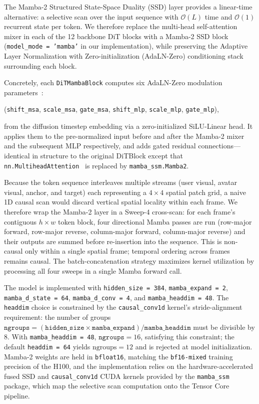 \documentclass[12pt,letterpaper]{report}
\begin{document}
The Mamba-2 Structured State-Space Duality (SSD) layer \cite{dao2024transformers} provides a linear-time alternative: a selective scan over the input sequence with $\mathcal{O}(L)$ time and $\mathcal{O}(1)$ recurrent state per token. We therefore replace the multi-head self-attention mixer in each of the 12 backbone DiT blocks with a Mamba-2 SSD block (\texttt{model\_mode = 'mamba'} in our implementation), while preserving the Adaptive Layer Normalization with Zero-initialization (AdaLN-Zero) conditioning stack surrounding each block.

Concretely, each \texttt{DiTMambaBlock} computes six AdaLN-Zero modulation parameters~\cite{peebles2023scalable}:

(\texttt{shift\_msa}, \texttt{scale\_msa}, \texttt{gate\_msa}, \texttt{shift\_mlp}, \texttt{scale\_mlp}, \texttt{gate\_mlp}),

\noindent from the diffusion timestep embedding via a zero-initialized SiLU-Linear head. It applies them to the pre-normalized input before and after the Mamba-2 mixer and the subsequent MLP respectively, and adds gated residual connections---identical in structure to the original DiTBlock except that \texttt{nn.MultiheadAttention}~\cite{vaswani2017attention} is replaced by \texttt{mamba\_ssm.Mamba2}.

Because the token sequence interleaves multiple streams (user visual, avatar visual, anchor, and target) each representing a $4 \times 4$ spatial patch grid, a naive 1D causal scan would discard vertical spatial locality within each frame. We therefore wrap the Mamba-2 layer in a Sweep-4 cross-scan: for each frame's contiguous $h \times w$ token block, four directional Mamba passes are run (row-major forward, row-major reverse, column-major forward, column-major reverse) and their outputs are summed before re-insertion into the sequence. This is non-causal only within a single spatial frame; temporal ordering across frames remains causal. The batch-concatenation strategy maximizes kernel utilization by processing all four sweeps in a single Mamba forward call.

The model is implemented with \texttt{hidden\_size = 384}, \texttt{mamba\_expand = 2}, \texttt{mamba\_d\_state = 64}, \texttt{mamba\_d\_conv = 4}, and \texttt{mamba\_headdim = 48}. The \texttt{headdim} choice is constrained by the \texttt{causal\_conv1d} kernel's stride-alignment requirement: the number of groups $\texttt{ngroups} = (\texttt{hidden\_size} \times \texttt{mamba\_expand}) / \texttt{mamba\_headdim}$ must be divisible by 8. With \texttt{mamba\_headdim = 48}, $\texttt{ngroups} = 16$, satisfying this constraint; the default \texttt{headdim = 64} yields $\text{ngroups} = 12$ and is rejected at model initialization. Mamba-2 weights are held in \texttt{bfloat16}, matching the \texttt{bf16-mixed} training precision of the H100, and the implementation relies on the hardware-accelerated fused SSD and \texttt{causal\_conv1d} CUDA kernels provided by the \texttt{mamba\_ssm} package, which map the selective scan computation onto the Tensor Core pipeline.
\end{document}
